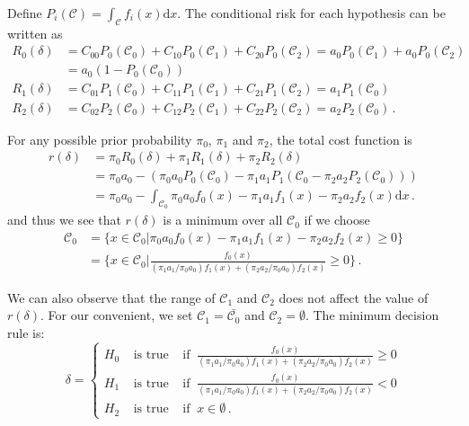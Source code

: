 \documentclass[12pt,journal,a4paper,twoside,onecolumn]{IEEEtran}
\begin{document}
\begin{spacing}{2.5}
Define $P_i(\mathcal{C}) = \int_{\mathcal{C}} f_i(x)\mathrm{d}x$. The conditional risk for each hypothesis can be written as
\begin{equation}
\begin{split}
R_0(\delta) &= C_{00}P_0(\mathcal{C}_0) + C_{10}P_0(\mathcal{C}_1) + C_{20}P_0(\mathcal{C}_2) = a_0P_0(\mathcal{C}_1) + a_0P_0(\mathcal{C}_2)\\
&= a_0(1 - P_0(\mathcal{C}_0))\\
R_1(\delta) &= C_{01}P_1(\mathcal{C}_0) + C_{11}P_1(\mathcal{C}_1) + C_{21}P_1(\mathcal{C}_2) = a_1P_1(\mathcal{C}_0)\\
R_2(\delta) &= C_{02}P_2(\mathcal{C}_0) + C_{12}P_2(\mathcal{C}_1) + C_{22}P_2(\mathcal{C}_2) = a_2P_2(\mathcal{C}_0)\,.
\end{split}
\end{equation}

For any possible prior probability $\pi_0$, $\pi_1$ and $\pi_2$, the total cost function is 
\begin{equation}
\begin{split}
r(\delta) &= \pi_0 R_0(\delta) + \pi_1R_1(\delta) + \pi_2R_2(\delta)\\
&= \pi_0a_0 - (\pi_0a_0P_0(\mathcal{C}_0) - \pi_1a_1P_1(\mathcal{C}_0 - \pi_2a_2P_2(\mathcal{C}_0)))\\
&= \pi_0a_0 - \int_{\mathcal{C}_0}\pi_0a_0f_0(x) - \pi_1a_1f_1(x) - \pi_2a_2f_2(x) \mathrm{d}x\,. 
\end{split}
\end{equation}
and thus we see that $r(\delta)$ is a minimum over all $\mathcal{C}_0$ if we choose
\begin{equation}
\begin{split}
\label{equ: C}
\mathcal{C}_0 &= \{ x\in \mathcal{C}_0 | \pi_0a_0f_0(x) - \pi_1a_1f_1(x) - \pi_2a_2f_2(x) \geq 0\}\\
&= \{ x\in \mathcal{C}_0 | \frac{f_0(x)}{(\pi_1a_1/\pi_0a_0)f_1(x) + (\pi_2a_2/\pi_0a_0)f_2(x)} \geq 0 \}\,.
\end{split}
\end{equation}

We can also observe that the range of $\mathcal{C}_1$ and $\mathcal{C}_2$ does not affect the value of $r(\delta)$. For our convenient, we set $\mathcal{C}_1 = \bar{\mathcal{C}_0}$ and $\mathcal{C}_2 = \emptyset$. The minimum decision rule is: 
\begin{equation}
\label{equ: decR2}
\delta = \begin{cases}
H_0 \;\;\;\;\text{is true}\;\;\;\;\text{if}\;\; \frac{f_0(x)}{(\pi_1a_1/\pi_0a_0)f_1(x) + (\pi_2a_2/\pi_0a_0)f_2(x)} \geq 0\\
H_1 \;\;\;\;\text{is true}\;\;\;\;\text{if}\;\; \frac{f_0(x)}{(\pi_1a_1/\pi_0a_0)f_1(x) + (\pi_2a_2/\pi_0a_0)f_2(x)} < 0\\
H_2 \;\;\;\;\text{is true}\;\;\;\;\text{if}\;\; x \in \emptyset\,.
\end{cases}
\end{equation}


\end{spacing}
\end{document}
